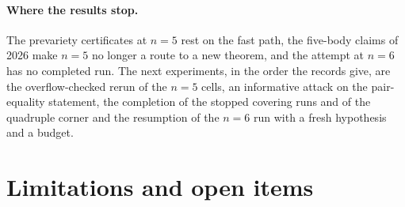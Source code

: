 \documentclass[11pt]{article}
\theoremstyle{definition}
\theoremstyle{remark}
\begin{document}
\paragraph{Where the results stop.}
The prevariety certificates at $n=5$ rest on the fast path, the five-body claims of 2026 make $n=5$ no longer a route to a new theorem, and the attempt at $n=6$ has no completed run. The next
experiments, in the order the records give, are the overflow-checked rerun of the $n=5$ cells, an informative attack on the pair-equality statement, the completion of the stopped covering runs and of the quadruple corner and
the resumption of the $n=6$ run with a fresh hypothesis and a budget.

\section{Limitations and open items}\label{sec:limits}
\end{document}
